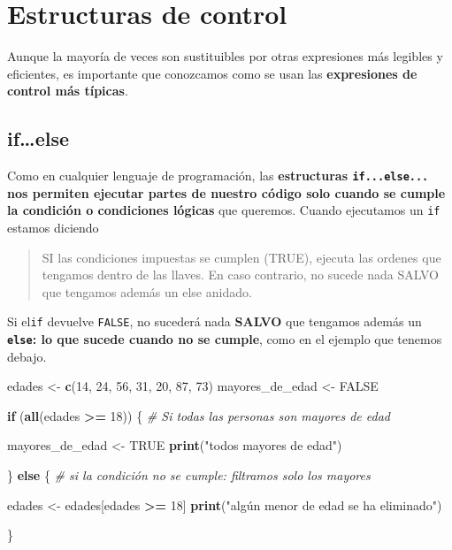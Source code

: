 \documentclass[11pt,]{book}
\newenvironment{Shaded}{\begin{snugshade}}{\end{snugshade}}
\newcommand{\CommentTok}[1]{\textcolor[rgb]{0.37,0.37,0.37}{\textit{#1}}}
\newcommand{\ControlFlowTok}[1]{\textcolor[rgb]{0.27,0.27,0.27}{\textbf{#1}}}
\newcommand{\DecValTok}[1]{\textcolor[rgb]{0.06,0.06,0.06}{#1}}
\newcommand{\KeywordTok}[1]{\textcolor[rgb]{0.27,0.27,0.27}{\textbf{#1}}}
\newcommand{\NormalTok}[1]{#1}
\newcommand{\OperatorTok}[1]{\textcolor[rgb]{0.43,0.43,0.43}{\textbf{#1}}}
\newcommand{\OtherTok}[1]{\textcolor[rgb]{0.37,0.37,0.37}{#1}}
\newcommand{\StringTok}[1]{\textcolor[rgb]{0.5,0.5,0.5}{#1}}
\begin{document}
\hypertarget{control}{%
\chapter{Estructuras de control}\label{control}}

Aunque la mayoría de veces son sustituibles por otras expresiones más legibles y eficientes, es importante que conozcamos como se usan las \textbf{expresiones de control más típicas}.

\hypertarget{ifelse}{%
\section{if\ldots{}else}\label{ifelse}}

Como en cualquier lenguaje de programación, las \textbf{estructuras \texttt{if...else...} nos permiten ejecutar partes de nuestro código solo cuando se cumple la condición o condiciones lógicas} que queremos. Cuando ejecutamos un \texttt{if} estamos diciendo

\begin{quote}
SI las condiciones impuestas se cumplen (TRUE), ejecuta las ordenes que tengamos dentro de las llaves. En caso contrario, no sucede nada SALVO que tengamos además un else anidado.
\end{quote}

Si el\texttt{if} devuelve \texttt{FALSE}, no sucederá nada \textbf{SALVO} que tengamos además un \textbf{\texttt{else}: lo que sucede cuando no se cumple}, como en el ejemplo que tenemos debajo.

\begin{Shaded}
\begin{Highlighting}[]
\NormalTok{edades <-}\StringTok{ }\KeywordTok{c}\NormalTok{(}\DecValTok{14}\NormalTok{, }\DecValTok{24}\NormalTok{, }\DecValTok{56}\NormalTok{, }\DecValTok{31}\NormalTok{, }\DecValTok{20}\NormalTok{, }\DecValTok{87}\NormalTok{, }\DecValTok{73}\NormalTok{)}
\NormalTok{mayores_de_edad <-}\StringTok{ }\OtherTok{FALSE} 

\ControlFlowTok{if}\NormalTok{ (}\KeywordTok{all}\NormalTok{(edades }\OperatorTok{>=}\StringTok{ }\DecValTok{18}\NormalTok{)) \{ }\CommentTok{# Si todas las personas son mayores de edad}
  
\NormalTok{  mayores_de_edad <-}\StringTok{ }\OtherTok{TRUE}
  \KeywordTok{print}\NormalTok{(}\StringTok{"todos mayores de edad"}\NormalTok{)}
  
\NormalTok{\} }\ControlFlowTok{else}\NormalTok{ \{ }\CommentTok{# si la condición no se cumple: filtramos solo los mayores}

\NormalTok{  edades <-}\StringTok{ }\NormalTok{edades[edades }\OperatorTok{>=}\StringTok{ }\DecValTok{18}\NormalTok{]  }
  \KeywordTok{print}\NormalTok{(}\StringTok{"algún menor de edad se ha eliminado"}\NormalTok{)}
  
\NormalTok{\}}
\end{Highlighting}
\end{Shaded}
\end{document}
